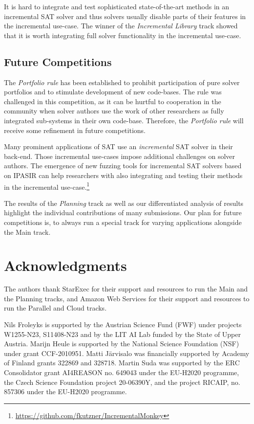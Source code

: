 \documentclass{elsarticle}
\begin{document}
It is hard to integrate and test sophisticated state-of-the-art methods in an incremental SAT solver and thus solvers usually disable parts of their features in the incremental use-case. 
The winner of the \emph{Incremental Library} track showed that it is worth integrating full solver functionality in the incremental use-case. 

\subsection*{Future Competitions}

The \emph{Portfolio rule} has been established to prohibit participation of pure solver portfolios and to stimulate development of new code-bases. 
The rule was challenged in this competition, as it can be hurtful to cooperation in the community when solver authors use the work of other researchers as fully integrated sub-systems in their own code-base. 
Therefore, the \emph{Portfolio rule} will receive some refinement in future competitions. 

Many prominent applications of SAT use an \emph{incremental} SAT solver in their back-end. 
Those incremental use-cases impose additional challenges on solver authors. 
The emergence of new fuzzing tools for incremental SAT solvers based on IPASIR can help researchers with also integrating and testing their methods in the incremental use-case.\footnote{\url{https://github.com/fkutzner/IncrementalMonkey}} 

The results of the \emph{Planning} track as well as our differentiated analysis of results highlight the individual contributions of many submissions. 
Our plan for future competitions is, to always run a special track for varying applications alongside the Main track. 


\section*{Acknowledgments}
The authors thank StarExec for their support and resources to run the Main and the Planning tracks, and Amazon Web Services 
for their support and resources to run the Parallel and Cloud tracks. 

Nils Froleyks is supported by the Austrian Science Fund (FWF) under projects
W1255-N23, S11408-N23 and by the LIT AI Lab funded by the State of Upper
Austria.
%
Marijn Heule is supported by the National Science Foundation (NSF) under grant CCF-2010951. 
%
Matti J\"arvisalo was financially supported by Academy of Finland grants 322869 and 328718.
%
Martin Suda was supported by the ERC Consolidator grant AI4REASON no. 649043 under the EU-H2020 programme,
the Czech Science Foundation project 20-06390Y, and the project RICAIP, no. 857306 under the EU-H2020 programme.





\end{document}
